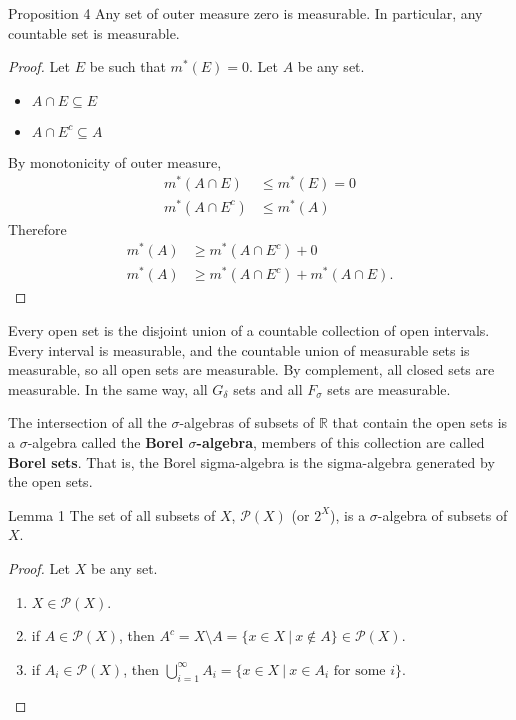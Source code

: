 \begin{flushleft}
	\begin{namedthm*}{Proposition 4}
		Any set of outer measure zero is measurable. In particular, any countable set is measurable.
	\end{namedthm*}
	\begin{proof}
		Let $E$ be such that $m^*(E)=0$. Let $A$ be any set.\\
		\begin{itemize}
			\item $A\cap E\subseteq E$
			\item $A\cap E^c\subseteq A$
		\end{itemize}
		By monotonicity of outer measure,
		\begin{align*}
			m^*(A\cap E)&\le m^*(E)=0\\
			m^*(A\cap E^c)&\le m^*(A)
		\end{align*}
		Therefore
		\begin{align*}
			m^*(A)&\ge m^*(A\cap E^c)+0\\
			m^*(A)&\ge m^*(A\cap E^c)+m^*(A\cap E).
		\end{align*}
	\end{proof}

	Every open set is the disjoint union of a countable collection of open intervals. Every interval is measurable, and the countable union of measurable sets is measurable, so all open sets are measurable.
	By complement, all closed sets are measurable. In the same way, all $G_\delta$ sets and all $F_\sigma$ sets are measurable.
	\par\medskip
	The intersection of all the $\sigma$-algebras of subsets of $\mathbb{R}$ that contain the open sets is a $\sigma$-algebra called the \textbf{Borel $\sigma$-algebra}, members of this collection are called \textbf{Borel sets}.
	That is, the Borel sigma-algebra is the sigma-algebra generated by the open sets.

	\begin{namedthm*}{Lemma 1}
		The set of all subsets of $X$, $\mathcal{P}(X)$ (or $2^X$), is a $\sigma$-algebra of subsets of $X$.
	\end{namedthm*}
	\begin{proof}
		Let $X$ be any set.
		\begin{enumerate}[label=(\roman*),align=left]   
			\item $X\in\mathcal{P}(X)$.
			\item if $A\in\mathcal{P}(X)$, then $A^c=X\setminus A = \{x\in X\ |\ x\notin A\}\in\mathcal{P}(X)$.
			\item if $A_i\in\mathcal{P}(X)$, then $\bigcup_{i=1}^\infty A_i = \{x\in X\ |\ x\in A_i\text{ for some }i\}$.
		\end{enumerate}
	\end{proof}


\end{flushleft}
